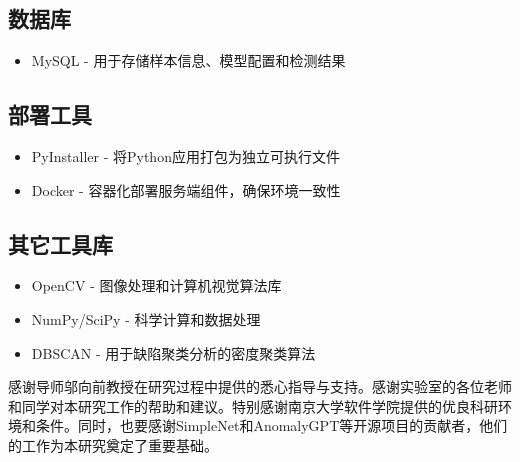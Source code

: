 \documentclass[
  ]{njuthesis}
\begin{document}
\subsection{数据库}
\begin{itemize}
    \item MySQL - 用于存储样本信息、模型配置和检测结果
\end{itemize}

\subsection{部署工具}
\begin{itemize}
    \item PyInstaller - 将Python应用打包为独立可执行文件
    \item Docker - 容器化部署服务端组件，确保环境一致性
\end{itemize}

\subsection{其它工具库}
\begin{itemize}
    \item OpenCV - 图像处理和计算机视觉算法库
    \item NumPy/SciPy - 科学计算和数据处理
    \item DBSCAN - 用于缺陷聚类分析的密度聚类算法
\end{itemize}


\printbibliography


\begin{acknowledgement}
  感谢导师邬向前教授在研究过程中提供的悉心指导与支持。感谢实验室的各位老师和同学对本研究工作的帮助和建议。特别感谢南京大学软件学院提供的优良科研环境和条件。同时，也要感谢SimpleNet和AnomalyGPT等开源项目的贡献者，他们的工作为本研究奠定了重要基础。
\end{acknowledgement}

\end{document}
